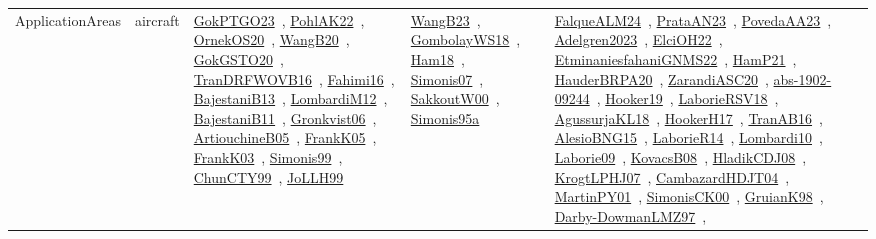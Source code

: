 {\begin{longtable}{lp{3cm}>{\raggedright\arraybackslash}p{6cm}>{\raggedright\arraybackslash}p{6cm}>{\raggedright\arraybackslash}p{8cm}}
ApplicationAreas & aircraft & \href{../works/GokPTGO23.pdf}{GokPTGO23}~\cite{GokPTGO23}, \href{../works/PohlAK22.pdf}{PohlAK22}~\cite{PohlAK22}, \href{../works/OrnekOS20.pdf}{OrnekOS20}~\cite{OrnekOS20}, \href{../works/WangB20.pdf}{WangB20}~\cite{WangB20}, \href{../works/GokGSTO20.pdf}{GokGSTO20}~\cite{GokGSTO20}, \href{../works/TranDRFWOVB16.pdf}{TranDRFWOVB16}~\cite{TranDRFWOVB16}, \href{../works/Fahimi16.pdf}{Fahimi16}~\cite{Fahimi16}, \href{../works/BajestaniB13.pdf}{BajestaniB13}~\cite{BajestaniB13}, \href{../works/LombardiM12.pdf}{LombardiM12}~\cite{LombardiM12}, \href{../works/BajestaniB11.pdf}{BajestaniB11}~\cite{BajestaniB11}, \href{../works/Gronkvist06.pdf}{Gronkvist06}~\cite{Gronkvist06}, \href{../works/ArtiouchineB05.pdf}{ArtiouchineB05}~\cite{ArtiouchineB05}, \href{../works/FrankK05.pdf}{FrankK05}~\cite{FrankK05}, \href{../works/FrankK03.pdf}{FrankK03}~\cite{FrankK03}, \href{../works/Simonis99.pdf}{Simonis99}~\cite{Simonis99}, \href{../works/ChunCTY99.pdf}{ChunCTY99}~\cite{ChunCTY99}, \href{../works/JoLLH99.pdf}{JoLLH99}~\cite{JoLLH99} & \href{../works/WangB23.pdf}{WangB23}~\cite{WangB23}, \href{../works/GombolayWS18.pdf}{GombolayWS18}~\cite{GombolayWS18}, \href{../works/Ham18.pdf}{Ham18}~\cite{Ham18}, \href{../works/Simonis07.pdf}{Simonis07}~\cite{Simonis07}, \href{../works/SakkoutW00.pdf}{SakkoutW00}~\cite{SakkoutW00}, \href{../works/Simonis95a.pdf}{Simonis95a}~\cite{Simonis95a} & \href{../works/FalqueALM24.pdf}{FalqueALM24}~\cite{FalqueALM24}, \href{../works/PrataAN23.pdf}{PrataAN23}~\cite{PrataAN23}, \href{../works/PovedaAA23.pdf}{PovedaAA23}~\cite{PovedaAA23}, \href{../works/Adelgren2023.pdf}{Adelgren2023}~\cite{Adelgren2023}, \href{../works/ElciOH22.pdf}{ElciOH22}~\cite{ElciOH22}, \href{../works/EtminaniesfahaniGNMS22.pdf}{EtminaniesfahaniGNMS22}~\cite{EtminaniesfahaniGNMS22}, \href{../works/HamP21.pdf}{HamP21}~\cite{HamP21}, \href{../works/HauderBRPA20.pdf}{HauderBRPA20}~\cite{HauderBRPA20}, \href{../works/ZarandiASC20.pdf}{ZarandiASC20}~\cite{ZarandiASC20}, \href{../works/abs-1902-09244.pdf}{abs-1902-09244}~\cite{abs-1902-09244}, \href{../works/Hooker19.pdf}{Hooker19}~\cite{Hooker19}, \href{../works/LaborieRSV18.pdf}{LaborieRSV18}~\cite{LaborieRSV18}, \href{../works/AgussurjaKL18.pdf}{AgussurjaKL18}~\cite{AgussurjaKL18}, \href{../works/HookerH17.pdf}{HookerH17}~\cite{HookerH17}, \href{../works/TranAB16.pdf}{TranAB16}~\cite{TranAB16}, \href{../works/AlesioBNG15.pdf}{AlesioBNG15}~\cite{AlesioBNG15}, \href{../works/LaborieR14.pdf}{LaborieR14}~\cite{LaborieR14}, \href{../works/Lombardi10.pdf}{Lombardi10}~\cite{Lombardi10}, \href{../works/Laborie09.pdf}{Laborie09}~\cite{Laborie09}, \href{../works/KovacsB08.pdf}{KovacsB08}~\cite{KovacsB08}, \href{../works/HladikCDJ08.pdf}{HladikCDJ08}~\cite{HladikCDJ08}, \href{../works/KrogtLPHJ07.pdf}{KrogtLPHJ07}~\cite{KrogtLPHJ07}, \href{../works/CambazardHDJT04.pdf}{CambazardHDJT04}~\cite{CambazardHDJT04}, \href{../works/MartinPY01.pdf}{MartinPY01}~\cite{MartinPY01}, \href{../works/SimonisCK00.pdf}{SimonisCK00}~\cite{SimonisCK00}, \href{../works/GruianK98.pdf}{GruianK98}~\cite{GruianK98}, \href{../works/Darby-DowmanLMZ97.pdf}{Darby-DowmanLMZ97}~\cite{Darby-DowmanLMZ97}, 
\end{longtable}}

